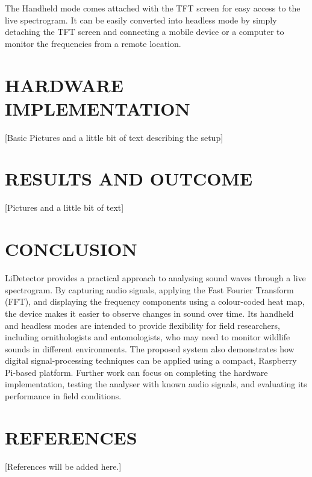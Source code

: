 \documentclass[12pt,a4paper]{article}
\begin{document}
The Handheld mode comes attached with the TFT screen for easy access to the live spectrogram. It can be easily converted into headless mode by simply detaching the TFT screen and connecting a mobile device or a computer to monitor the frequencies from a remote location. 

\section*{\textbf{HARDWARE IMPLEMENTATION}}
[Basic Pictures and a little bit of text describing the setup]

\section*{\textbf{RESULTS AND OUTCOME}}

[Pictures and a little bit of text]

\section*{\textbf{CONCLUSION}}
LiDetector provides a practical approach to analysing sound waves through a live spectrogram. By capturing audio signals, applying the Fast Fourier Transform (FFT), and displaying the frequency components using a colour-coded heat map, the device makes it easier to observe changes in sound over time. Its handheld and headless modes are intended to provide flexibility for field researchers, including ornithologists and entomologists, who may need to monitor wildlife sounds in different environments. The proposed system also demonstrates how digital signal-processing techniques can be applied using a compact, Raspberry Pi-based platform. Further work can focus on completing the hardware implementation, testing the analyser with known audio signals, and evaluating its performance in field conditions.

\section*{\textbf{REFERENCES}}

[References will be added here.]
\end{document}
